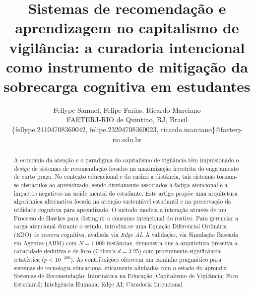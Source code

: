 \documentclass[english, spanish, brazilian]{RBIEarticle}
\title{Sistemas de recomendação e aprendizagem no capitalismo de vigilância: a curadoria intencional como instrumento de mitigação da sobrecarga cognitiva em estudantes}
\author{%
    \parbox{16cm}{%
        Fellype Samuel, Felipe Farias, Ricardo Marciano\\
        FAETERJ-RIO de Quintino, RJ, Brasil\\
        \{fellype.24104708360042, felipe.23204708360023, ricardo.marciano\}@faeterj-rio.edu.br
    }%
}
\begin{document}
\maketitle

\begin{otherlanguage}{brazilian}
\begin{abstract}
A economia da atenção e o paradigma do capitalismo de vigilância têm impulsionado o \textit{design} de sistemas de recomendação focados na maximização irrestrita do engajamento de curto prazo. No contexto educacional e do ensino a distância, tais sistemas tornam-se obstáculos ao aprendizado, sendo diretamente associados à fadiga atencional e a impactos negativos na saúde mental do estudante. Este artigo propõe uma arquitetura algorítmica alternativa focada na atenção sustentável estudantil e na preservação da utilidade cognitiva para aprendizado. O método modela a interação através de um Processo de Hawkes para distinguir o consumo intencional do reativo. Para gerenciar a carga atencional durante o estudo, introduz-se uma Equação Diferencial Ordinária (EDO) de reserva cognitiva, avaliada via \textit{Edge AI}. A validação, via Simulação Baseada em Agentes (ABM) com $N=1.000$ instâncias, demonstra que a arquitetura preserva a capacidade dedutiva e de foco (Cohen's $d = 3.25$) com proeminente significância estatística ($p < 10^{-300}$). As contribuições oferecem um caminho pragmático para sistemas de tecnologia educacional eticamente alinhados com o estado do aprendiz.
\keywords Sistemas de Recomendação; Informática na Educação; Capitalismo de Vigilância; Foco Estudantil; Inteligência Humana; Edge AI; Curadoria Intencional
\end{abstract}
\end{otherlanguage}
\end{document}
